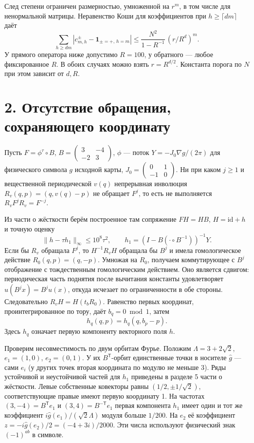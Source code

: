 \documentclass[11pt,a4paper]{article}
\newcommand{\sect}[1]{\section*{\sffamily\color{ink}#1}}
\begin{document}
След степени ограничен размерностью, умноженной на $r^m$, в том числе для ненормальной матрицы. Неравенство Коши для коэффициентов при $h\ge\lceil dm\rceil$ даёт
\[
 \sum_{h\ge dm}|c_{m,h}^\pm-\mathbf1_{\pm=+,\,h=m}|
       \le \frac{N^2}{1-R^{-1}}\,(r/R^d)^m .                                \tag{3}
\]
У прямого оператора ниже допустимо $R=100$, у обратного --- любое фиксированное $R$. В обоих случаях можно взять $r=R^{d/2}$. Константа порога по $N$ при этом зависит от $d,R$.
\newpage
\sect{2. Отсутствие обращения, сохраняющего координату}
Пусть $F=\phi^\tau\circ B$, $B=\left(\begin{smallmatrix}3&-4\\-2&3\end{smallmatrix}\right)$, $\phi$ --- поток $Y=-J_0\nabla g/(2\pi)$ для физического символа $g$ исходной карты, $J_0=\left(\begin{smallmatrix}0&1\\-1&0\end{smallmatrix}\right)$. Ни при каком $j\ge1$ и вещественной периодической $v(q)$ непрерывная инволюция $R_v(q,p)=(q,v(q)-p)$ не обращает $F^j$, то есть не выполняется $R_v F^j R_v=F^{-j}$.

Из части о жёсткости берём построенное там сопряжение $FH=HB$, $H=\mathrm{id}+h$ и точную оценку
\[
 \|h-\tau h_1\|_\infty\le10^8\tau^2,\qquad
 h_1=(I-B(\cdot\circ B^{-1}))^{-1}Y .
\]
Если бы $R_v$ обращала $F^j$, то $H^{-1}R_vH$ обращала бы $B^j$ и имела гомологическое действие $R_0(q,p)=(q,-p)$. Умножая на $R_0$, получаем коммутирующее с $B^j$ отображение с тождественным гомологическим действием. Оно является сдвигом: периодическая часть поднятия после вычитания константы удовлетворяет $u(B^jx)=B^ju(x)$, откуда исчезает по ограниченности в обе стороны. Следовательно $R_v H=H(t_b R_0)$. Равенство первых координат, проинтегрированное по тору, даёт $b_q=0\bmod1$, затем
\[
                         h_q(q,p)=h_q(q,b_p-p).
\]
Здесь $h_q$ означает первую компоненту векторного поля $h$.

Проверим несовместимость по двум орбитам Фурье. Положим $\Lambda=3+2\sqrt2$, $e_1=(1,0)$, $e_2=(0,1)$. У их $B^\mathsf{T}$-орбит единственные точки в носителе $\widehat g$ --- сами $e_i$ (у других точек вторая координата по модулю не меньше 3). Ряды устойчивой и неустойчивой частей для $h_1$ приведены в разделе 5 части о жёсткости. Левые собственные ковекторы равны $(1/2,\pm1/\sqrt2)$, соответствующие правые имеют первую координату 1. На частотах $(3,-4)=B^\mathsf{T}e_1$ и $(3,4)=B^{-\mathsf{T}}e_1$ первая компонента $h_1$ имеет один и тот же коэффициент $i\widehat g(e_1)/(\sqrt2\Lambda)$ модуля больше $1/200$. На $e_2$ её коэффициент $z=-i\widehat g(e_2)/2=(-4+3i)/2000$. Эти числа используют физический знак $(-1)^{ab}$ в символе.
\end{document}
